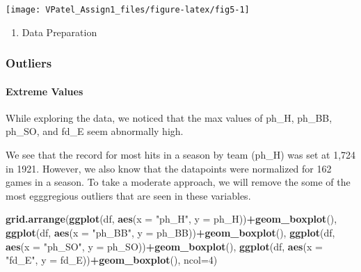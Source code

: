 \documentclass[]{article}
\newenvironment{Shaded}{\begin{snugshade}}{\end{snugshade}}
\newcommand{\DataTypeTok}[1]{\textcolor[rgb]{0.13,0.29,0.53}{#1}}
\newcommand{\DecValTok}[1]{\textcolor[rgb]{0.00,0.00,0.81}{#1}}
\newcommand{\KeywordTok}[1]{\textcolor[rgb]{0.13,0.29,0.53}{\textbf{#1}}}
\newcommand{\NormalTok}[1]{#1}
\newcommand{\OperatorTok}[1]{\textcolor[rgb]{0.81,0.36,0.00}{\textbf{#1}}}
\newcommand{\StringTok}[1]{\textcolor[rgb]{0.31,0.60,0.02}{#1}}
\providecommand{\tightlist}{%
  \setlength{\itemsep}{0pt}\setlength{\parskip}{0pt}}
\let\oldparagraph\paragraph
\renewcommand{\paragraph}[1]{\oldparagraph{#1}\mbox{}}
\begin{document}
\begin{center}\texttt{[image: VPatel\_Assign1\_files/figure-latex/fig5-1]} \end{center}

\begin{enumerate}
\def\labelenumi{\arabic{enumi}.}
\setcounter{enumi}{1}
\tightlist
\item
  Data Preparation
\end{enumerate}

\hypertarget{outliers}{%
\subsubsection{Outliers}\label{outliers}}

\hypertarget{extreme-values}{%
\paragraph{Extreme Values}\label{extreme-values}}

While exploring the data, we noticed that the max values of ph\_H,
ph\_BB, ph\_SO, and fd\_E seem abnormally high.

We see that the record for most hits in a season by team (ph\_H) was set
at 1,724 in 1921. However, we also know that the datapoints were
normalized for 162 games in a season. To take a moderate approach, we
will remove the some of the most egggregious outliers that are seen in
these variables.

\begin{Shaded}
\begin{Highlighting}[]
\KeywordTok{grid.arrange}\NormalTok{(}\KeywordTok{ggplot}\NormalTok{(df, }\KeywordTok{aes}\NormalTok{(}\DataTypeTok{x =} \StringTok{"ph_H"}\NormalTok{, }\DataTypeTok{y =}\NormalTok{ ph_H))}\OperatorTok{+}\KeywordTok{geom_boxplot}\NormalTok{(),}
             \KeywordTok{ggplot}\NormalTok{(df, }\KeywordTok{aes}\NormalTok{(}\DataTypeTok{x =} \StringTok{"ph_BB"}\NormalTok{, }\DataTypeTok{y =}\NormalTok{ ph_BB))}\OperatorTok{+}\KeywordTok{geom_boxplot}\NormalTok{(),}
             \KeywordTok{ggplot}\NormalTok{(df, }\KeywordTok{aes}\NormalTok{(}\DataTypeTok{x =} \StringTok{"ph_SO"}\NormalTok{, }\DataTypeTok{y =}\NormalTok{ ph_SO))}\OperatorTok{+}\KeywordTok{geom_boxplot}\NormalTok{(),}
             \KeywordTok{ggplot}\NormalTok{(df, }\KeywordTok{aes}\NormalTok{(}\DataTypeTok{x =} \StringTok{"fd_E"}\NormalTok{, }\DataTypeTok{y =}\NormalTok{ fd_E))}\OperatorTok{+}\KeywordTok{geom_boxplot}\NormalTok{(),}
             \DataTypeTok{ncol=}\DecValTok{4}\NormalTok{)}
\end{Highlighting}
\end{Shaded}
\end{document}
